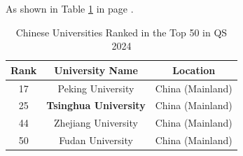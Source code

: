 \documentclass[12pt]{article}
\begin{document}
\lipsum[1]

As shown in Table \ref{tab:Univ-rank-2024} in page \pageref{tab:Univ-rank-2024}.

    \begin{table}[htbp]
        \centering
        \caption{Chinese Universities Ranked in the Top 50 in QS 2024}
        \label{tab:Univ-rank-2024}
        \begin{tabular}{@{}ccc@{}}
        \toprule
        Rank & University Name                               & Location         \\ \midrule
        17   & Peking University                             & China (Mainland) \\
        25   & \textbf{Tsinghua University}                  & China (Mainland) \\
        44   & Zhejiang University                           & China (Mainland) \\
        50   & Fudan University                              & China (Mainland) \\
        \bottomrule
        \end{tabular}
    \end{table}

\lipsum[2]
\end{document}
